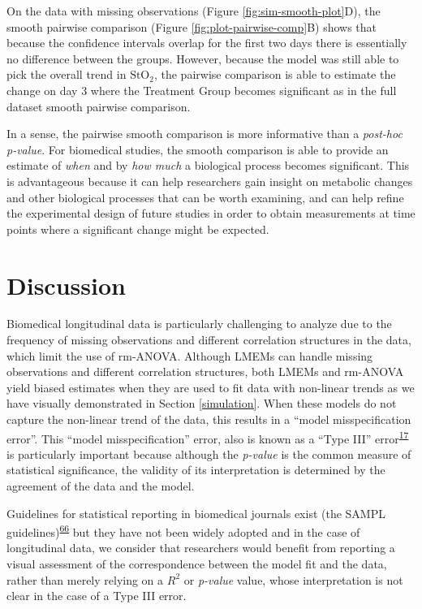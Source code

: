 \documentclass[
]{article}
\begin{document}
On the data with missing observations (Figure \ref{fig:sim-smooth-plot}D), the smooth pairwise comparison (Figure \ref{fig:plot-pairwise-comp}B) shows that because the confidence intervals overlap for the first two days there is essentially no difference between the groups. However, because the model was still able to pick the overall trend in \(\mbox{StO}_2\), the pairwise comparison is able to estimate the change on day 3 where the Treatment Group becomes significant as in the full dataset smooth pairwise comparison.

In a sense, the pairwise smooth comparison is more informative than a \emph{post-hoc} \emph{p-value}. For biomedical studies, the smooth comparison is able to provide an estimate of \emph{when} and by \emph{how much} a biological process becomes significant. This is advantageous because it can help researchers gain insight on metabolic changes and other biological processes that can be worth examining, and can help refine the experimental design of future studies in order to obtain measurements at time points where a significant change might be expected.

\hypertarget{discussion}{%
\section{Discussion}\label{discussion}}

Biomedical longitudinal data is particularly challenging to analyze due to the frequency of missing observations and different correlation structures in the data, which limit the use of rm-ANOVA. Although LMEMs can handle missing observations and different correlation structures, both LMEMs and rm-ANOVA yield biased estimates when they are used to fit data with non-linear trends as we have visually demonstrated in Section \ref{simulation}. When these models do not capture the non-linear trend of the data, this results in a ``model misspecification error''. This ``model misspecification'' error, also is known as a ``Type III'' error\textsuperscript{\protect\hyperlink{ref-dennis2019}{17}} is particularly important because although the \emph{p-value} is the common measure of statistical significance, the validity of its interpretation is determined by the agreement of the data and the model.

Guidelines for statistical reporting in biomedical journals exist (the SAMPL guidelines)\textsuperscript{\protect\hyperlink{ref-lang2015}{66}} but they have not been widely adopted and in the case of longitudinal data, we consider that researchers would benefit from reporting a visual assessment of the correspondence between the model fit and the data, rather than merely relying on a \(R^2\) or \emph{p-value} value, whose interpretation is not clear in the case of a Type III error.
\end{document}
